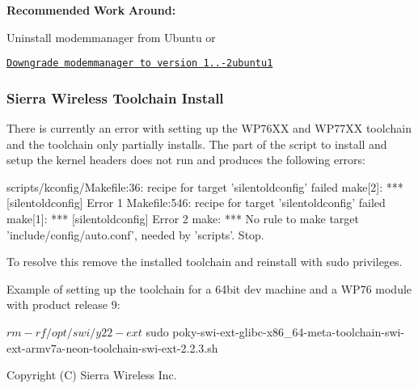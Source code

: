 {\bfseries Recommended} {\bfseries Work} {\bfseries Around\+:} 
\begin{DoxyItemize}
\item Uninstall {\ttfamily modemmanager} from Ubuntu or
\item \href{http://packages.ubuntu.com/trusty/modemmanager}{\tt Downgrade {\ttfamily modemmanager} to version 1..-\/2ubuntu1}
\end{DoxyItemize}\hypertarget{releaseNotes18060_rn1806_ConstraintsTC}{}\subsubsection{Sierra Wireless Toolchain Install}\label{releaseNotes18060_rn1806_ConstraintsTC}
There is currently an error with setting up the W\+P76\+XX and W\+P77\+XX toolchain and the toolchain only partially installs. The part of the script to install and setup the kernel headers does not run and produces the following errors\+:

\begin{DoxyVerb}scripts/kconfig/Makefile:36: recipe for target 'silentoldconfig' failed
make[2]: *** [silentoldconfig] Error 1
Makefile:546: recipe for target 'silentoldconfig' failed
make[1]: *** [silentoldconfig] Error 2
make: *** No rule to make target 'include/config/auto.conf', needed by 'scripts'.  Stop.
\end{DoxyVerb}


To resolve this remove the installed toolchain and reinstall with {\ttfamily sudo} privileges.

Example of setting up the toolchain for a 64bit dev machine and a W\+P76 module with product release 9\+: \begin{DoxyVerb}$ rm -rf /opt/swi/y22-ext
$ sudo poky-swi-ext-glibc-x86_64-meta-toolchain-swi-ext-armv7a-neon-toolchain-swi-ext-2.2.3.sh
\end{DoxyVerb}


Copyright (C) Sierra Wireless Inc. 